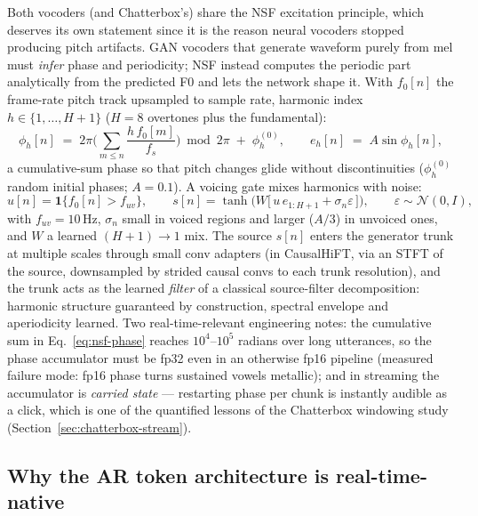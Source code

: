 \documentclass[11pt,a4paper]{article}
\newcommand{\fs}{\ensuremath{f_{s}}}                %
\begin{document}
Both vocoders (and Chatterbox's) share the NSF excitation principle, which deserves its
own statement since it is the reason neural vocoders stopped producing pitch artifacts.
GAN vocoders that generate waveform purely from mel must \emph{infer} phase and
periodicity; NSF instead computes the periodic part analytically from the predicted F0
and lets the network shape it. With $f_0[n]$ the frame-rate pitch track upsampled to
sample rate, harmonic index $h \in \{1, \dots, H{+}1\}$ ($H = 8$ overtones plus the
fundamental):
\begin{equation}
\phi_h[n] \;=\; 2\pi \Big( \sum_{m \le n} \frac{h\, f_0[m]}{\fs} \Big) \bmod 2\pi
\;+\; \phi_h^{(0)},
\qquad
e_h[n] \;=\; A \sin \phi_h[n],
\label{eq:nsf-phase}
\end{equation}
a cumulative-sum phase so that pitch changes glide without discontinuities
($\phi_h^{(0)}$ random initial phases; $A = 0.1$). A voicing gate mixes harmonics with
noise:
\begin{equation}
u[n] = \mathbf{1}\{f_0[n] > f_{uv}\}, \qquad
s[n] = \tanh\!\Big( W \big[\, u\, e_{1:H+1} + \sigma_n \varepsilon \,\big] \Big),
\qquad \varepsilon \sim \mathcal{N}(0, I),
\label{eq:nsf-mix}
\end{equation}
with $f_{uv} = 10$\,Hz, $\sigma_n$ small in voiced regions and larger ($A/3$) in
unvoiced ones, and $W$ a learned $(H{+}1) \to 1$ mix. The source $s[n]$ enters the
generator trunk at multiple scales through small conv adapters (in CausalHiFT, via an
STFT of the source, downsampled by strided causal convs to each trunk resolution), and
the trunk acts as the learned \emph{filter} of a classical source-filter decomposition:
harmonic structure guaranteed by construction, spectral envelope and aperiodicity
learned. Two real-time-relevant engineering notes: the cumulative sum in
Eq.~\eqref{eq:nsf-phase} reaches $10^4$--$10^5$ radians over long utterances, so the
phase accumulator must be fp32 even in an otherwise fp16 pipeline (measured failure mode:
fp16 phase turns sustained vowels metallic); and in streaming the accumulator is
\emph{carried state} --- restarting phase per chunk is instantly audible as a click,
which is one of the quantified lessons of the Chatterbox windowing study
(Section~\ref{sec:chatterbox-stream}).

\subsection{Why the AR token architecture is real-time-native}
\label{sec:why-ar}
\end{document}
